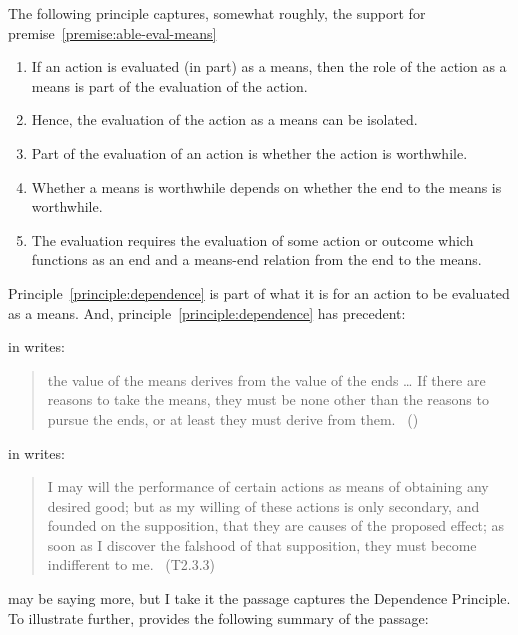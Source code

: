 \documentclass[10pt]{article}
\newcommand{\dependencePrinciple}[0]{\textsf{Dependence Principle}}
\begin{document}
The following principle captures, somewhat roughly, the support for premise~\ref{premise:able-eval-means}

\principleMEdependence*

\begin{enumerate}
\item If an action is evaluated (in part) as a means, then the role of the action as a means is part of the evaluation of the action.
\item Hence, the evaluation of the action as a means can be isolated.
\item Part of the evaluation of an action is whether the action is worthwhile.
\item Whether a means is worthwhile depends on whether the end to the means is worthwhile.
\item The evaluation requires the evaluation of some action or outcome which functions as an end and a means-end relation from the end to the means.
\end{enumerate}

Principle~\ref{principle:dependence} is part of what it is for an action to be evaluated as a means.
And, principle~\ref{principle:dependence} has precedent:

\citeauthor{Raz:2005aa} in  writes:
\begin{quote}
    the value of the means derives from the value of the ends \dots
    If there are reasons to take the means, they must be none other than the reasons to pursue the ends, or at least they must derive from them.\nolinebreak
  \mbox{ }\hfill(\cite[2]{Raz:2005aa})
\end{quote}

\citeauthor{Hume:2011aa} in  writes:

\begin{quote}
  I may will the performance of certain actions as means of obtaining any desired good; but as my willing of these actions is only secondary, and founded on the supposition, that they are causes of the proposed effect; as soon as I discover the falshood of that supposition, they must become indifferent to me.\nolinebreak
  \mbox{ }\hfill\mbox{\hfill(T2.3.3)}
\end{quote}

\citeauthor{Hume:2011aa} may be saying more, but I take it the passage captures the \dependencePrinciple.
To illustrate further, \citeauthor{Smith:2015ab} provides the following summary of the passage:
\end{document}
